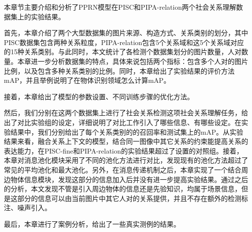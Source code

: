 本章节主要介绍和分析了PPRN模型在PISC和PIPA-relation两个社会关系理解数据集上的实验结果。

首先，本章介绍了两个大型数据集的图片来源、构造方式、关系类别的划分，其中PISC数据集包含两种关系粒度，PIPA-relation包含5个关系域和这5个关系域对应的15种关系类别。与此同时，本文统计了各检测个数据集划分的图片数量，人对数量。本章进一步分析数据集的特点，具体来说包括两个指标：包含多个人对的图片比例，以及包含多种关系类别的比例。同时，本章给出了实验结果的评价方法mAP，并且举例说明了在物体识别领域怎么计算mAP。

接着，本章给出了模型的参数设置、不同训练步骤的优化方法。

然后，我们分别在这两个数据集上进行了社会关系检测这项社会关系理解任务，给出了对比实验组的设定，详细说明了对比工作引入了哪些信息、有哪些设定。在实验结果中，我们分别给出了每个关系类别的的召回率和测试集上的mAP。从实验结果来看，融合关系上下文的模型，结合同一图像中其它关系的约束能提高关系的表达能力，在PISC-fine和PIPA-relation的实验结果超过了设置的对照组。接着，本章对消息池化模块采用了不同的池化方法进行对比，发现现有的池化方法超过了常见的平均池化和最大池化。另外，在消息传递机制之后，本章实现了一个结合周边物体信息模块，发现这部分的信息加入后并没有进一步提高实验结果。通过之后的分析，本文发现不管是引入周边物体的信息还是先验知识，均属于场景信息，但是这部分的信息可以由当前图片中其它人对的关系提供，并且不存在额外的检测标注、噪声引入。

最后，本章进行了案例分析，给出了一些真实测例的结果。



